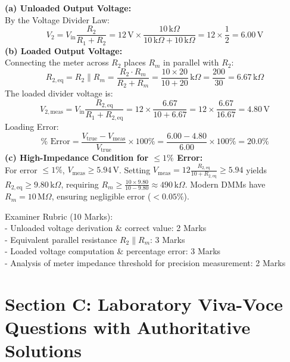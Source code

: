 \begin{solbox}
\textbf{(a) Unloaded Output Voltage:}\\
By the Voltage Divider Law:\\
\[ V_2 = V_{\mathrm{in}} \frac{R_2}{R_1 + R_2} = 12\,\mathrm{V} \times \frac{10\,\mathrm{k}\Omega}{10\,\mathrm{k}\Omega + 10\,\mathrm{k}\Omega} = 12 \times \frac{1}{2} = 6.00\,\mathrm{V} \]
\textbf{(b) Loaded Output Voltage:}\\
Connecting the meter across $R_2$ places $R_m$ in parallel with $R_2$:\\
\[ R_{2,\mathrm{eq}} = R_2 \parallel R_m = \frac{R_2 \cdot R_m}{R_2 + R_m} = \frac{10 \times 20}{10 + 20}\,\mathrm{k}\Omega = \frac{200}{30} = 6.67\,\mathrm{k}\Omega \]
The loaded divider voltage is:\\
\[ V_{2,\mathrm{meas}} = V_{\mathrm{in}} \frac{R_{2,\mathrm{eq}}}{R_1 + R_{2,\mathrm{eq}}} = 12 \times \frac{6.67}{10 + 6.67} = 12 \times \frac{6.67}{16.67} = 4.80\,\mathrm{V} \]
Loading Error:\\
\[ \%\text{ Error} = \frac{V_{\mathrm{true}} - V_{\mathrm{meas}}}{V_{\mathrm{true}}} \times 100\% = \frac{6.00 - 4.80}{6.00} \times 100\% = 20.0\% \]
\textbf{(c) High-Impedance Condition for $\le 1\%$ Error:}\\
For error $\le 1\%$, $V_{\mathrm{meas}} \ge 5.94\,\mathrm{V}$. Setting $V_{\mathrm{meas}} = 12 \frac{R_{2,\mathrm{eq}}}{10 + R_{2,\mathrm{eq}}} \ge 5.94$ yields $R_{2,\mathrm{eq}} \ge 9.80\,\mathrm{k}\Omega$, requiring $R_m \ge \frac{10 \times 9.80}{10 - 9.80} \approx 490\,\mathrm{k}\Omega$. Modern DMMs have $R_m = 10\,\mathrm{M}\Omega$, ensuring negligible error ($< 0.05\%$).
\end{solbox}

\begin{examinertip}
Examiner Rubric (10 Marks):\\
- Unloaded voltage derivation \& correct value: 2 Marks\\
- Equivalent parallel resistance $R_2 \parallel R_m$: 3 Marks\\
- Loaded voltage computation \& percentage error: 3 Marks\\
- Analysis of meter impedance threshold for precision measurement: 2 Marks
\end{examinertip}


\section{Section C: Laboratory Viva-Voce Questions with Authoritative Solutions}

